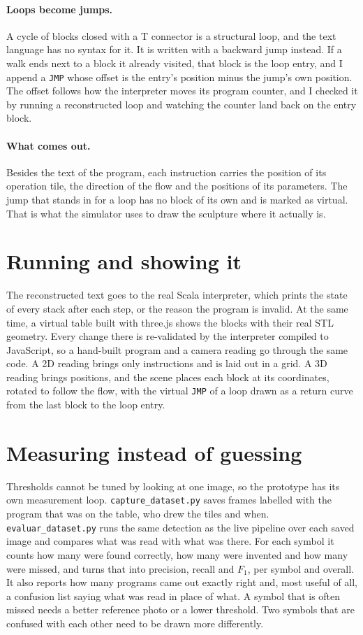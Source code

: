\documentclass[11pt,a4paper]{article}
\newcommand{\code}[1]{\texttt{#1}}
\begin{document}
\paragraph{Loops become jumps.} A cycle of blocks closed with a T connector is a structural loop, and the text language has no syntax for it. It is written with a backward jump instead. If a walk ends next to a block it already visited, that block is the loop entry, and I append a \code{JMP} whose offset is the entry's position minus the jump's own position. The offset follows how the interpreter moves its program counter, and I checked it by running a reconstructed loop and watching the counter land back on the entry block.

\paragraph{What comes out.} Besides the text of the program, each instruction carries the position of its operation tile, the direction of the flow and the positions of its parameters. The jump that stands in for a loop has no block of its own and is marked as virtual. That is what the simulator uses to draw the sculpture where it actually is.

\section{Running and showing it}

The reconstructed text goes to the real Scala interpreter, which prints the state of every stack after each step, or the reason the program is invalid. At the same time, a virtual table built with three.js shows the blocks with their real STL geometry. Every change there is re-validated by the interpreter compiled to JavaScript, so a hand-built program and a camera reading go through the same code. A 2D reading brings only instructions and is laid out in a grid. A 3D reading brings positions, and the scene places each block at its coordinates, rotated to follow the flow, with the virtual \code{JMP} of a loop drawn as a return curve from the last block to the loop entry.

\section{Measuring instead of guessing}
\label{sec:eval}

Thresholds cannot be tuned by looking at one image, so the prototype has its own measurement loop. \code{capture\_dataset.py} saves frames labelled with the program that was on the table, who drew the tiles and when. \code{evaluar\_dataset.py} runs the same detection as the live pipeline over each saved image and compares what was read with what was there. For each symbol it counts how many were found correctly, how many were invented and how many were missed, and turns that into precision, recall and $F_1$, per symbol and overall. It also reports how many programs came out exactly right and, most useful of all, a confusion list saying what was read in place of what. A symbol that is often missed needs a better reference photo or a lower threshold. Two symbols that are confused with each other need to be drawn more differently.
\end{document}

